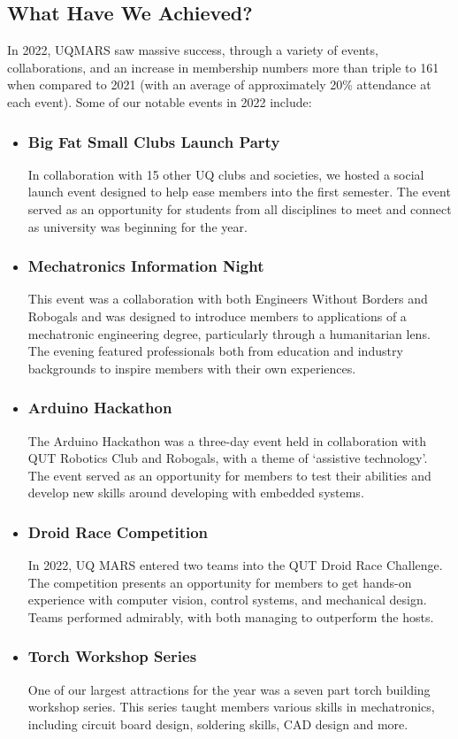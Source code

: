 \documentclass[a4paper,12pt]{report}
\begin{document}
\subsection*{What Have We Achieved?}
In 2022, UQMARS saw massive success, through a variety of events, collaborations, and an increase in membership numbers more than triple to 161 when compared to 2021 (with an average of approximately 20\% attendance at each event).
Some of our notable events in 2022 include:
\begin{itemize}
    \item \subsubsection{Big Fat Small Clubs Launch Party}
    In collaboration with 15 other UQ clubs and societies, we hosted a social launch event designed to help ease members into the first semester.
    The event served as an opportunity for students from all disciplines to meet and connect as university was beginning for the year.
    \item \subsubsection{Mechatronics Information Night}
    This event was a collaboration with both Engineers Without Borders and Robogals and was designed to introduce members to applications of a mechatronic engineering degree, particularly through a humanitarian lens.
    The evening featured professionals both from education and industry backgrounds to inspire members with their own experiences.
    \item \subsubsection{Arduino Hackathon}
    The Arduino Hackathon was a three-day event held in collaboration with QUT Robotics Club and Robogals, with a theme of ‘assistive technology’.
    The event served as an opportunity for members to test their abilities and develop new skills around developing with embedded systems.
    \item \subsubsection{Droid Race Competition}
    In 2022, UQ MARS entered two teams into the QUT Droid Race Challenge.
    The competition presents an opportunity for members to get hands-on experience with computer vision, control systems, and mechanical design.
    Teams performed admirably, with both managing to outperform the hosts.
    \item \subsubsection{Torch Workshop Series}
    One of our largest attractions for the year was a seven part torch building workshop series. This series taught members various skills in mechatronics, including circuit board design, soldering skills, CAD design and more.
\end{itemize}
\end{document}
